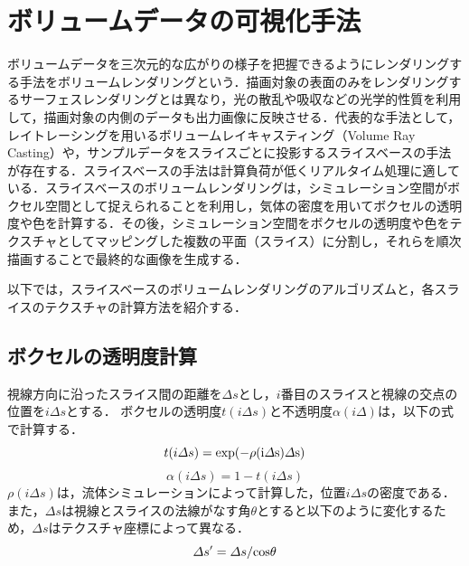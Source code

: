 \documentclass[a4j,12pt]{jreport}
\begin{document}
\section{ボリュームデータの可視化手法}
ボリュームデータを三次元的な広がりの様子を把握できるようにレンダリングする手法をボリュームレンダリングという．描画対象の表面のみをレンダリングするサーフェスレンダリングとは異なり，光の散乱や吸収などの光学的性質を利用して，描画対象の内側のデータも出力画像に反映させる．代表的な手法として，レイトレーシングを用いるボリュームレイキャスティング（Volume Ray Casting）や，サンプルデータをスライスごとに投影するスライスベースの手法が存在する．スライスベースの手法は計算負荷が低くリアルタイム処理に適している．スライスベースのボリュームレンダリングは，シミュレーション空間がボクセル空間として捉えられることを利用し，気体の密度を用いてボクセルの透明度や色を計算する．その後，シミュレーション空間をボクセルの透明度や色をテクスチャとしてマッピングした複数の平面（スライス）に分割し，それらを順次描画することで最終的な画像を生成する．

以下では，スライスベースのボリュームレンダリングのアルゴリズムと，各スライスのテクスチャの計算方法を紹介する．
\subsection{ボクセルの透明度計算}
視線方向に沿ったスライス間の距離を$\varDelta s$とし，$i$番目のスライスと視線の交点の位置を$i\varDelta s$とする．
ボクセルの透明度$t(i\varDelta s)$と不透明度$\alpha( i\varDelta) $は，以下の式で計算する．
\[t( i\varDelta s) = \rm{exp}( -\rho(i\varDelta s) \varDelta s)\]
\[\alpha( i\varDelta s) = 1 - t( i\varDelta s) \]
%
$\rho(i\varDelta s)$は，流体シミュレーションによって計算した，位置$i\varDelta s$の密度である．
%
また，$\varDelta s$は視線とスライスの法線がなす角$\theta$とすると以下のように変化するため，$\varDelta s$はテクスチャ座標によって異なる．
%
\begin{equation}\label{eq:cos}
\varDelta s' = \varDelta s / \rm{cos}\theta
\end{equation}
\end{document}
